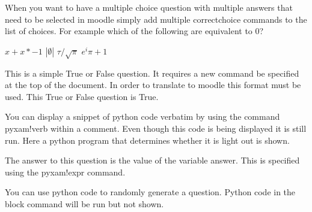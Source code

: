 \documentclass[12pt]{exam}
\newcommand{\tf}[1][{}]{%
        \fillin[#1][0.25in]%
    }
\begin{document}
\begin{questions}
                When you want to have a multiple choice question with multiple answers that need to be selected in moodle
                simply add multiple correctchoice commands to the list of choices. For example which of the following
                are equivalent to 0?
                \begin{choices}
                    \CorrectChoice $x + x*-1$
                    \CorrectChoice $|\emptyset|$
                    \choice $\tau / \sqrt{\pi}$
                    \CorrectChoice $e^i\pi + 1$
                \end{choices}

                \tf[T] This is a simple True or False question. It requires a new command be specified at the top of the
                document. In order to translate to moodle this format must be used. This True or False question is True.

                You can display a snippet of python code verbatim by using the command pyxam!verb within a comment. Even
                though this code is being displayed it is still run. Here a python program that determines whether it is
                light out is shown.
                \begin{comment}
                    pyxam!verb

from time import localtime
# Is it dark outside?
dark = {
    1:16,2:17,3:18,4:19,5:19,6:20,7:20,8:19,9:18,10:17,11:16,12:16
}

light = {
    1:8,2:7,3:6,4:5,5:4,6:4,7:4,8:5,9:6,10:6,11:7,12:8
}
if localtime().tm_hour >=dark[localtime().tm_mon] or localtime().tm_hour < light[localtime().tm_mon]:
    answer = 'Yes'
else:
    answer = 'No'

                \end{comment}
                The answer to this question is the value of the variable answer. This is specified using the pyxam!expr
                command.
                \begin{solution}
                \end{solution}

                You can use python code to randomly generate a question. Python code in the block command will be run but not
                shown.
                \begin{comment} pyxam!block


\end{comment}
\end{questions}
\end{document}
